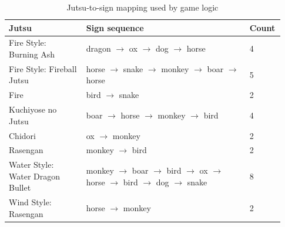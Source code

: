 \begin{table}[H]
\centering
\caption{Jutsu-to-sign mapping used by game logic}
\label{tab:jutsu_sign_sequences}
\begin{tabular}{p{0.27\linewidth}p{0.58\linewidth}p{0.08\linewidth}}
\toprule
Jutsu & Sign sequence & Count \\
\midrule
Fire Style: Burning Ash & dragon $\rightarrow$ ox $\rightarrow$ dog $\rightarrow$ horse & 4 \\
Fire Style: Fireball Jutsu & horse $\rightarrow$ snake $\rightarrow$ monkey $\rightarrow$ boar $\rightarrow$ horse & 5 \\
Fire & bird $\rightarrow$ snake & 2 \\
Kuchiyose no Jutsu & boar $\rightarrow$ horse $\rightarrow$ monkey $\rightarrow$ bird & 4 \\
Chidori & ox $\rightarrow$ monkey & 2 \\
Rasengan & monkey $\rightarrow$ bird & 2 \\
Water Style: Water Dragon Bullet & monkey $\rightarrow$ boar $\rightarrow$ bird $\rightarrow$ ox $\rightarrow$ horse $\rightarrow$ bird $\rightarrow$ dog $\rightarrow$ snake & 8 \\
Wind Style: Rasengan & horse $\rightarrow$ monkey & 2 \\
\bottomrule
\end{tabular}
\end{table}
